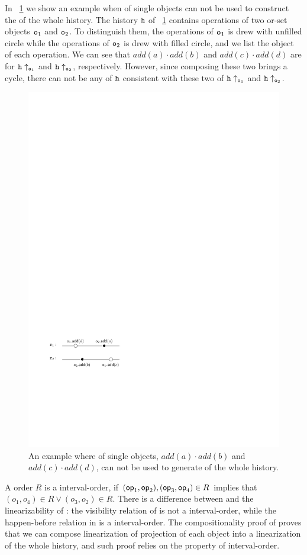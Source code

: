 In \figurename~\ref{fig:an example of linearization of single objects do not imply a linearization of the whole history} we show an example when \crdtlinearization{} of single objects can not be used to construct the \crdtlinearization{} of the whole history. The history $\mathtt{h}$ of \figurename~\ref{fig:an example of linearization of single objects do not imply a linearization of the whole history} contains operations of two or-set objects $\mathtt{o}_1$ and $\mathtt{o}_2$. To distinguish them, the operations of $\mathtt{o}_1$ is drew with unfilled circle while the operations of $\mathtt{o}_2$ is drew with filled circle, and we list the object of each operation. We can see that $\mathit{add}(a) \cdot \mathit{add}(b)$ and $\mathit{add}(c) \cdot \mathit{add}(d)$ are \crdtlinearization{} for $\mathtt{h} \uparrow_{\mathtt{o}_1}$ and $\mathtt{h} \uparrow_{\mathtt{o}_2}$, respectively. However, since composing these two \crdtlinearization{} brings a cycle, there can not be any \crdtlinearization{} of $\mathtt{h}$ consistent with these two \crdtlinearization{} of $\mathtt{h} \uparrow_{\mathtt{o}_1}$ and $\mathtt{h} \uparrow_{\mathtt{o}_2}$.

\begin{figure}[t]
  \centering
  \includegraphics[width=0.35 \textwidth]{figures/TwoSubLin-NotaGlobalLin.pdf}
\vspace{-10pt}
  \caption{An example where \crdtlinearization{} of single objects, $\mathit{add}(a) \cdot \mathit{add}(b)$ and $\mathit{add}(c) \cdot \mathit{add}(d)$, can not be used to generate \crdtlinearization{} of the whole history.}
  \label{fig:an example of linearization of single objects do not imply a linearization of the whole history}
\end{figure}

A order $R$ is a interval-order, if $(\mathsf{op}_1,\mathsf{op}_2), (\mathsf{op}_3,\mathsf{op}_4) \in R$ implies that $(o_1,o_4) \in R \vee (o_3,o_2) \in R$. There is a difference between \crdtlin{} and the linearizability of \cite{HerlihyW90}: the visibility relation of \crdtlin{} is not a interval-order, while the happen-before relation in \cite{HerlihyW90} is a interval-order. The compositionality proof of \cite{HerlihyW90} proves that we can compose linearization of projection of each object into a linearization of the whole history, and such proof relies on the property of interval-order.


